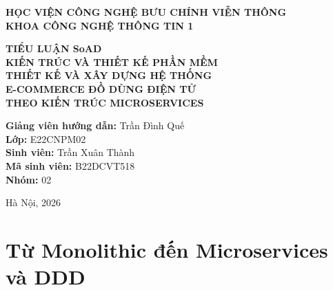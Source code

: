 \documentclass[12pt,a4paper]{report}
\begin{document}
\begin{titlepage}
    \begin{center}
        \textbf{HỌC VIỆN CÔNG NGHỆ BƯU CHÍNH VIỄN THÔNG}\\[0.3cm]
        \textbf{KHOA CÔNG NGHỆ THÔNG TIN 1}\\[0.5cm]
        \vspace{2.5cm}

        {\Large\textbf{TIỂU LUẬN SoAD}}\\[0.3cm]
        {\Large\textbf{KIẾN TRÚC VÀ THIẾT KẾ PHẦN MỀM}}\\[1.1cm]

        {\LARGE\textbf{THIẾT KẾ VÀ XÂY DỰNG HỆ THỐNG}}\\[0.3cm]
        {\LARGE\textbf{E-COMMERCE ĐỒ DÙNG ĐIỆN TỬ}}\\[0.3cm]
        {\LARGE\textbf{THEO KIẾN TRÚC MICROSERVICES}}\\[2cm]
    \end{center}

    \vspace{1cm}

    \begin{flushleft}
        \hspace*{3.5cm}\textbf{Giảng viên hướng dẫn:} Trần Đình Quế\\[0.4cm]
        \hspace*{3.5cm}\textbf{Lớp:} E22CNPM02\\[0.4cm]
        \hspace*{3.5cm}\textbf{Sinh viên:} Trần Xuân Thành\\[0.4cm]
        \hspace*{3.5cm}\textbf{Mã sinh viên:} B22DCVT518\\[0.4cm]
        \hspace*{3.5cm}\textbf{Nhóm:} 02
    \end{flushleft}

    \vfill
    \begin{center}
        Hà Nội, 2026
    \end{center}
\end{titlepage}

\tableofcontents
\clearpage

\chapter{Từ Monolithic đến Microservices và DDD}
\end{document}
